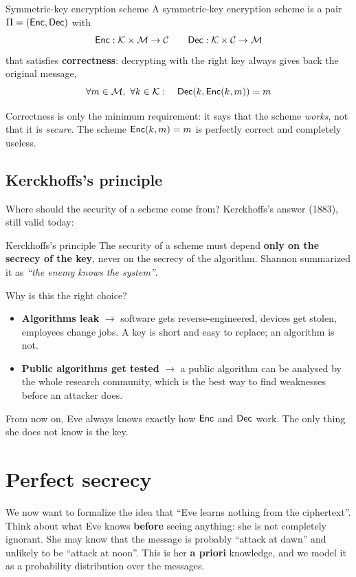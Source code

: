 \begin{frameddefn}[label={def:ske}]{Symmetric-key encryption scheme}
  A symmetric-key encryption scheme is a pair $\Pi = (\mathsf{Enc}, \mathsf{Dec})$ with
  \[
    \mathsf{Enc} : \mathcal{K} \times \mathcal{M} \to \mathcal{C} \qquad \mathsf{Dec} : \mathcal{K} \times \mathcal{C} \to \mathcal{M}
  \]
  that satisfies \textbf{correctness}: decrypting with the right key always gives back the original message,
  \[
    \forall m \in \mathcal{M},\ \forall k \in \mathcal{K} : \quad \mathsf{Dec}(k, \mathsf{Enc}(k, m)) = m
  \]
\end{frameddefn}

Correctness is only the minimum requirement: it says that the scheme \textit{works}, not that it is \textit{secure}. The scheme $\mathsf{Enc}(k, m) = m$ is perfectly correct and completely useless.

\subsection{Kerckhoffs's principle}

Where should the security of a scheme come from? Kerckhoffs's answer (1883), still valid today:

\begin{framedobs}{Kerckhoffs's principle}
  The security of a scheme must depend \textbf{only on the secrecy of the key}, never on the secrecy of the algorithm. Shannon summarized it as \textit{``the enemy knows the system''}.
\end{framedobs}

Why is this the right choice?
\begin{itemize}
  \item \textbf{Algorithms leak} $\to$ software gets reverse-engineered, devices get stolen, employees change jobs. A key is short and easy to replace; an algorithm is not.
  \item \textbf{Public algorithms get tested} $\to$ a public algorithm can be analysed by the whole research community, which is the best way to find weaknesses before an attacker does.
\end{itemize}
From now on, Eve always knows exactly how $\mathsf{Enc}$ and $\mathsf{Dec}$ work. The only thing she does not know is the key.

\section{Perfect secrecy}\label{sec:perfect-secrecy}

We now want to formalize the idea that ``Eve learns nothing from the ciphertext''. Think about what Eve knows \textbf{before} seeing anything: she is not completely ignorant. She may know that the message is probably ``attack at dawn'' and unlikely to be ``attack at noon''. This is her \textbf{a priori} knowledge, and we model it as a probability distribution over the messages.

